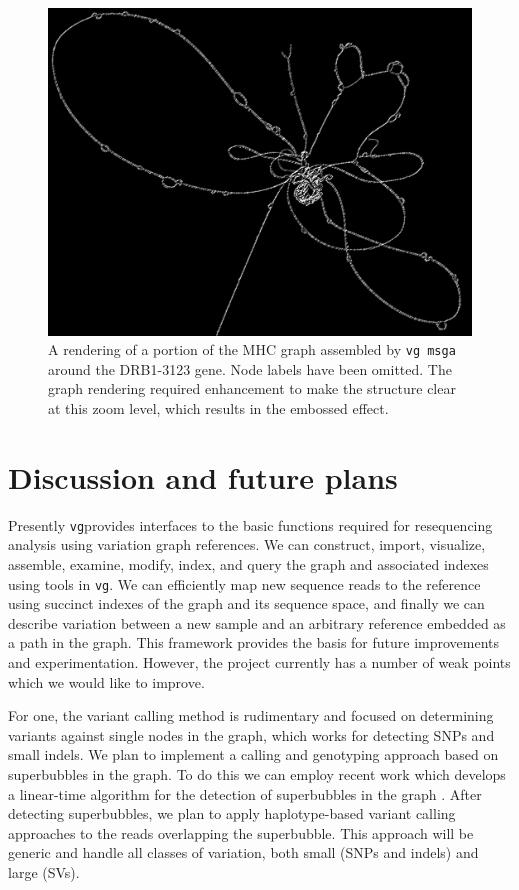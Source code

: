 \documentclass[12pt]{article}
\newcommand{\vg}{{\tt vg}}
\begin{document}
\begin{figure}[t]
\centering
\includegraphics[width=1.0\textwidth]{figures/DRB1-3123}
\caption{\label{fig:DRB1-3123}
  A rendering of a portion of the MHC graph assembled by {\tt vg msga} around the DRB1-3123 gene.
  Node labels have been omitted. The graph rendering required enhancement to make the structure clear at this zoom level, which results in the embossed effect.
}
\end{figure}

\section{Discussion and future plans}

Presently \vg provides interfaces to the basic functions required for resequencing analysis using variation graph references.
We can construct, import, visualize, assemble, examine, modify, index, and query the graph and associated indexes using tools in \vg.
We can efficiently map new sequence reads to the reference using succinct indexes of the graph and its sequence space, and finally we can describe variation between a new sample and an arbitrary reference embedded as a path in the graph.
This framework provides the basis for future improvements and experimentation.
However, the project currently has a number of weak points which we would like to improve.

For one, the variant calling method is rudimentary and focused on determining variants against single nodes in the graph, which works for detecting SNPs and small indels.
We plan to implement a calling and genotyping approach based on superbubbles in the graph.
To do this we can employ recent work which develops a linear-time algorithm for the detection of superbubbles in the graph \cite{brankovic2016linear}.
After detecting superbubbles, we plan to apply haplotype-based variant calling approaches \cite{garrison2012haplotype} to the reads overlapping the superbubble.
This approach will be generic and handle all classes of variation, both small (SNPs and indels) and large (SVs).
\end{document}
